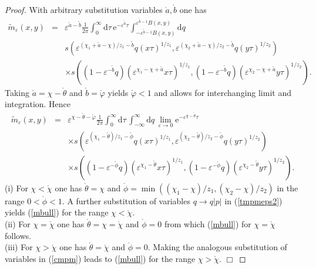 \documentclass[12pt]{article}
\newcommand{\rmd}{\mathrm{d}}
\newcommand{\rme}{\mathrm{e}}
\def\qed{\hfill$\Box$\par\medskip\par\relax}
\begin{document}
\begin{proof}

With arbitrary substitution variables $\mathring{a},\mathring{b}$
one has
\begin{eqnarray}
\tilde{m}_{\varepsilon}(x,y) 
& = & \varepsilon^{\mathring{a}-\mathring{b}} 
\frac{1}{2\pi} \int_{0}^{\infty} \rmd \tau \, 
\rme^{-\varepsilon^{\mathring{a}}\tau} 
\int_{-\varepsilon^{\mathring{b}-1}B(x,y)}^{\varepsilon^{\mathring{b}-1}B(x,y)} \rmd q \, 
\nonumber \\ & & 
s(
\varepsilon^{(\chi_1+\mathring{a}-\chi)/z_1-\mathring{b}}  
q (x \tau)^{1/z_1}, \varepsilon^{(\chi_2+\mathring{a}-\chi)/z_2-\mathring{b}}
q (y \tau)^{1/z_2})
\nonumber \\ & & 
\times s((1-\varepsilon^{-\mathring{b}}q) (\varepsilon^{\chi_1-\chi+\mathring{a}} x \tau)^{1/z_1},
(1-\varepsilon^{-\mathring{b}}q) (\varepsilon^{\chi_2-\chi+\mathring{a}} y \tau)^{1/z_2}).
\end{eqnarray}
Taking $\mathring{a} = \chi - \mathring{\theta}$ and
$\mathring{b} = 
\mathring{\varphi}$ yields $\mathring{\varphi} < 1$ and
allows for interchanging limit and integration. Hence
\begin{eqnarray}
\tilde{m}_{\varepsilon}(x,y) 
& = & \varepsilon^{\chi - \mathring{\theta} - \mathring{\varphi}} \frac{1}{2\pi} \int_{0}^{\infty} \rmd \tau \, \int_{-\infty}^{\infty} \rmd q \, \lim_{\varepsilon \to 0}
\rme^{-\varepsilon^{\chi - \mathring{\theta}}\tau} 
\nonumber \\ & & 
\times s(
\varepsilon^{(\chi_1 - \mathring{\theta})/z_1-\mathring{\phi}}  
q (x \tau)^{1/z_1}, 
\varepsilon^{(\chi_2 - \mathring{\theta})/z_2-\mathring{\phi}}
q (y \tau)^{1/z_2})
\nonumber \\ & & 
\times s((1-\varepsilon^{-\mathring{\phi}}q) (\varepsilon^{\chi_1-\mathring{\theta}} x \tau)^{1/z_1},
(1-\varepsilon^{-\mathring{\phi}}q) (\varepsilon^{\chi_2-\mathring{\theta}} y \tau)^{1/z_2}).
\label{tmpmeps2}
\end{eqnarray}
(i) For $\chi < \mathring{\chi}$ one has $\mathring{\theta}=\chi$
and $\mathring{\phi} = 
\min{((\chi_1 - \chi)/z_1,(\chi_2 - \chi)/z_2)}$ in the range $0<\mathring{\phi}<1$. A further substitution of
variables $q \to q |p|$ in (\ref{tmpmeps2}) yields (\ref{mbull})
for the range $\chi < \mathring{\chi}$.\\
(ii) For $\chi = \mathring{\chi}$ one has $\mathring{\theta}=\chi=\mathring{\chi}$
and $\mathring{\phi} = 0$ from which 
(\ref{mbull}) for $\chi = \mathring{\chi}$ follows.\\
(iii) For $\chi > \mathring{\chi}$ one has $\mathring{\theta} = 
\mathring{\chi}$ and $\mathring{\phi} = 0$. Making the
analogous substitution of variables in
(\ref{cmpm}) 
leads to (\ref{mbull})
for the range $\chi > \mathring{\chi}$.
\qed
\end{proof}
\end{document}
